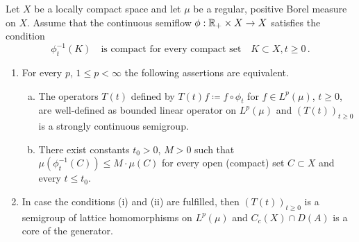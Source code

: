 \begin{proposition}\label{prop:c3-4.11}
Let $X$ be a locally compact space and let $\mu$ be a
regular, positive Borel measure on $X$. Assume that the continuous
semiflow $\phi : \mathbb{R} _+ \times X \to X$ satisfies the condition
\begin{equation}\label{eq:c3-4.12}
	\phi_t^{-1}(K) \quad \text{is compact for every compact set} \quad K \subset X , t \geq 0\,.
\end{equation}
%
%
\begin{enumerate}[\upshape (i)]
	\item		
	For every $p$, $1 \leq p < \infty$ the following assertions are equivalent.
		\begin{enumerate} [(a)]
			\item
			The operators $T(t)$ defined by $T(t)f \coloneqq  f \circ \phi_t$ for $f \in L^p(\mu)$,
			$t \geq 0$, are well-defined as bounded linear operator on $L^p(\mu)$
			and $(T(t))_{t \geq 0}$ is a strongly continuous semigroup.
			
			\item 
			There exist constants $t_0 > 0$, $M > 0$ such that 
			$\mu(\phi_t^{-1}(C)) \leq M \cdot \mu(C)$ for every open (compact) set $C \subset X$ and every $t \leq t_0$.
		\end{enumerate}
	
	\item 
	In case the conditions (i) and (ii) are fulfilled, then $(T(t))_{t \geq 0}$
	is a semigroup of lattice homomorphisms on $L^p(\mu)$ and $C_c(X) \cap D(A)$ is
	a core of the generator.
	
\end{enumerate}
\end{proposition}

